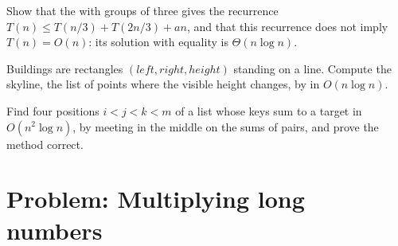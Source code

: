 \begin{exercise}[$\star\star\star$]\label{exo:b1:divide-and-conquer:10}
Show that the  with groups of three gives the recurrence $T(n) \leq T(n/3) + T(2n/3) + an$, and that
this recurrence does not imply $T(n) = O(n)$: its solution with equality is $\Theta(n \log n)$.
\end{exercise}

\begin{exercise}[$\star\star\star$]\label{exo:b1:divide-and-conquer:11}
Buildings are rectangles $(\mathit{left}, \mathit{right}, \mathit{height})$ standing on a line. Compute the skyline,
the list of points where the visible height changes, by  in $O(n \log n)$.
\end{exercise}

\begin{exercise}[$\star\star\star$]\label{exo:b1:divide-and-conquer:12}
Find four positions $i < j < k < m$ of a list whose keys sum to a target in $O(n^2 \log n)$, by meeting in the middle
on the sums of pairs, and prove the method correct.
\end{exercise}

\section{Problem: Multiplying long numbers}\label{sec:b1:divide-and-conquer:problem}

